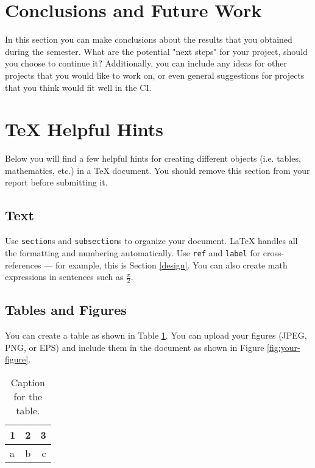 \documentclass[paper=a4, fontsize=11pt,twoside]{scrartcl}
\begin{document}
\section{Conclusions and Future Work}

In this section you can make conclusions about the results that you obtained during the semester. What are the potential "next steps" for your project, should you choose to continue it? Additionally, you can include any ideas for other projects that you would like to work on, or even general suggestions for projects that you think would fit well in the CI.

\section*{TeX Helpful Hints}\label{design}

Below you will find a few helpful hints for creating different objects (i.e. tables, mathematics, etc.) in a TeX document. You should remove this section from your report before submitting it.

\subsection*{Text}

Use \texttt{section}s and \texttt{subsection}s to organize your document. \LaTeX{} handles all the formatting and numbering automatically. Use \texttt{ref} and \texttt{label} for cross-references --- for example, this is Section \ref{design}. You can also create math expressions in sentences such as $\frac{\pi}{2}$.

\subsection*{Tables and Figures}

You can create a table as shown in Table \ref{tab:table1}. You can upload your figures (JPEG, PNG, or EPS) and include them in the document as shown in Figure \ref{fig:your-figure}.

\begin{table}
	\centering
	\caption{Caption for the table.}
	\label{tab:table1}
	\begin{tabular}{l|c||r}
		\hline
		1 & 2 & 3\\
		\hline
		a & b & c\\
		\hline
	\end{tabular}
\end{table}
\end{document}
